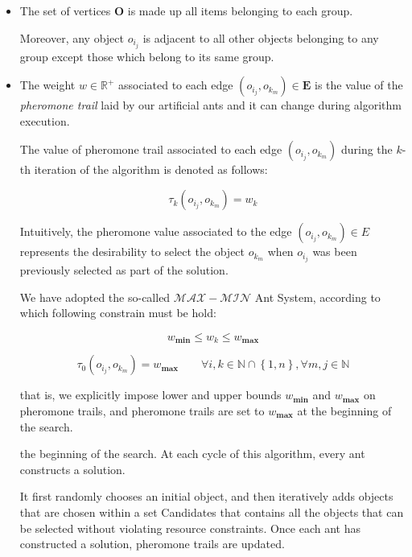 \documentclass[12pt,a4paper]{report}
\newcommand{\N}{\mathbb{N}}
\newcommand{\Rplus}{\mathbb{R}^+}
\begin{document}
\begin{itemize}
	
	\item The set of vertices $\textbf{O}$ is made up all items belonging to each group. 
	
	Moreover, any object $o_{i_j}$ is adjacent to all other objects belonging to any group except those which belong to its same group.
	
	\item The weight $w \in \Rplus$ associated to each edge $(o_{i_j}, o_{k_m}) \in \textbf{E}$ is the value of the \textit{pheromone trail} laid by our artificial ants and it can change during algorithm execution. 
	
	The value of pheromone trail associated to each edge $(o_{i_j}, o_{k_m})$ during the $k$-th iteration of the algorithm is denoted as follows:
	
	\begin{equation}
		\tau_k(o_{i_j}, o_{k_m}) = w_k
	\end{equation}
	
	Intuitively, the pheromone value associated to the edge $(o_{i_j}, o_{k_m}) \in E$ represents the desirability to select the object $o_{k_m}$ when $o_{i_j}$ was been previously selected as part of the solution.
	
	We have adopted the so-called $\mathcal{MAX} - \mathcal{MIN}$ Ant System, according to which following constrain must be hold:
	
	\begin{equation}
		w_{\textbf{min}} \leq w_k \leq w_{\textbf{max}} 
	\end{equation}

	\begin{equation}
		\tau_0(o_{i_j}, o_{k_m}) = w_{\textbf{max}} \qquad \forall i,k \in \N \cap \left\{1,n\right\}, \forall m,j \in \N 
	\end{equation}
	
	that is, we explicitly impose lower and upper bounds $w_{\textbf{min}}$ and $w_{\textbf{max}}$ on pheromone
	trails, and pheromone trails are set to $w_{\textbf{max}}$ at the beginning of the search.
	
	
	the beginning of the search.
	At each cycle of this algorithm, every ant constructs a solution. 
	
	It first randomly chooses an initial object, and then iteratively adds objects that are chosen within a set Candidates that contains all the objects that can be selected without violating resource constraints. Once each ant has constructed a solution, pheromone trails are updated. 
	
	
\end{itemize}
\end{document}
